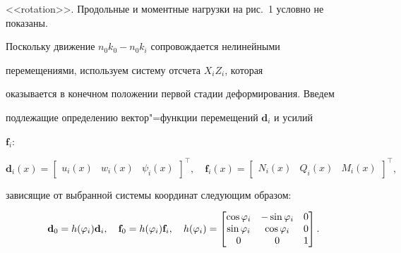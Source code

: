 <<rotation>>. Продольные и моментные нагрузки на рис.~1 условно не показаны.



Поскольку движение $n_0k_0-n_0k_i$ сопровождается нелинейными

перемещениями, используем систему отсчета $X_i Z_i$, которая

оказывается в конечном положении первой стадии деформирования. Введем

подлежащие определению вектор"=функции перемещений $\textbf{d}_i$ и усилий

$\textbf{f}_i$:

\begin{equation}

\label{elen:eq2}

\textbf{d}_i (x)=\begin{bmatrix}u_i (x) & w_i (x) & \psi _i (x) \end{bmatrix}^\top,

\quad

\textbf{f}_i (x)=\begin{bmatrix} N_i (x) & Q_i (x) &  M_i (x)\end{bmatrix}^\top,

\end{equation}

зависящие от выбранной системы координат следующим образом:

\begin{equation}

\label{elen:eq3}

\textbf {d}_0 =h(\varphi _i )\textbf{d}_i, \quad

\textbf{f}_0 =h(\varphi _i )\textbf{f}_i, \quad

h(\varphi _i )=\begin{bmatrix}

\cos \varphi _i & -\sin \varphi _i & 0 \\

\sin \varphi _i & \cos \varphi _i  & 0 \\

 0 & 0  & 1

\end{bmatrix}.

\vspace{-5mm}

\end{equation}



\pagebreak



